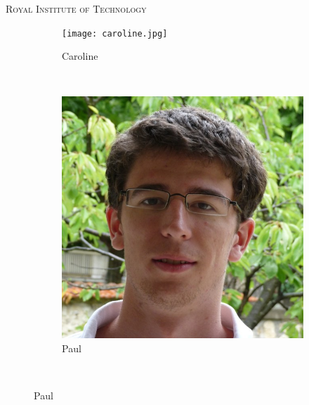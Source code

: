 \documentclass[a4paper,10pt]{article}
\title{}
\author{}
\begin{document}
\begin{titlepage}
\begin{center}


\textsc{\LARGE Royal Institute of Technology}\\[1.5cm]


\begin{figure}[h]
        \centering
        \begin{subfigure}[b]{0.2\textwidth}
                \centering
                \texttt{[image: caroline.jpg]}
                \caption{Caroline}
                \label{fig:Caroline}
        \end{subfigure}%
        ~ %
        \begin{subfigure}[b]{0.2\textwidth}
                \centering
                \includegraphics[width=\textwidth]{paul.jpg}
                \caption{Paul}
                \label{fig:Paul}
        \end{subfigure}
        \\ %

\end{figure}
\end{center}
\end{titlepage}
\end{document}
